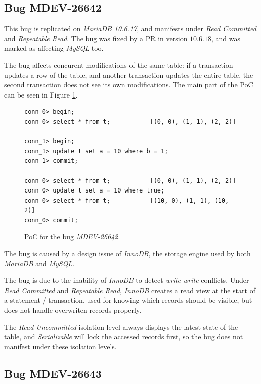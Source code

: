 \subsection*{Bug MDEV-26642}


This bug is replicated on \textit{MariaDB 10.6.17}, and manifests under \textit{Read Committed} and \textit{Repeatable Read}. The bug was fixed by a PR in version \textit{$10.6.18$}, and was marked as affecting \textit{MySQL} too.


The bug affects concurent modifications of the same table: if a transaction updates a row of the table, and another transaction updates the entire table, the second transaction does not see its own modifications. The main part of the PoC can be seen in Figure \ref{fig:MDEV-26642}.


\begin{figure}[H]
\begin{verbatim}
conn_0> begin;
conn_0> select * from t;        -- [(0, 0), (1, 1), (2, 2)]

conn_1> begin;
conn_1> update t set a = 10 where b = 1;
conn_1> commit;

conn_0> select * from t;        -- [(0, 0), (1, 1), (2, 2)]
conn_0> update t set a = 10 where true;
conn_0> select * from t;        -- [(10, 0), (1, 1), (10, 2)]
conn_0> commit;
\end{verbatim}
\caption{PoC for the bug \textit{MDEV-26642}.} \label{fig:MDEV-26642}
\end{figure}

The bug is caused by a design issue of \textit{InnoDB}, the storage engine used by both \textit{MariaDB} and \textit{MySQL}.

The bug is due to the inability of \textit{InnoDB} to detect \textit{write-write} conflicts. Under \textit{Read Committed} and \textit{Repeatable Read}, \textit{InnoDB} creates a read view at the start of a statement / transaction, used for knowing which records should be visible, but does not handle overwriten records properly. 

The \textit{Read Uncommitted} isolation level always displays the latest state of the table, and \textit{Serializable} will lock the accessed records first, so the bug does not manifest under these isolation levels.

\subsection*{Bug MDEV-26643}


